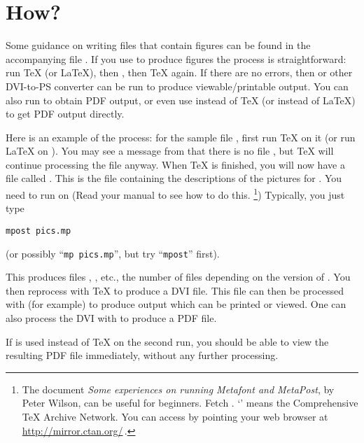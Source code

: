\documentclass[letterpaper]{article}
\begin{document}
\section{How?}\label{process}

Some guidance on writing files that contain \mfp{} figures can be found
in the accompanying file . If you use \mfp{} to
produce \MP{} figures the process is straightforward: run \TeX{} (or
\LaTeX), then \MP{}, then \TeX{} again. If there are no errors, then
 or other DVI-to-PS converter can be run to produce
viewable\slash printable output. You can also run  to obtain PDF
output, or even use \pdfTeX{} instead of \TeX{} (or \pdfLaTeX{} instead
of \LaTeX{}) to get PDF output directly.

Here is an example of the process: for the sample file
, first run \TeX{} on it (or run \LaTeX{} on
). You may see a message from \mfp{} that there is
no file , but \TeX{} will continue processing the file
anyway. When \TeX{} is finished, you will now have a file called
. This is the \MP{} file containing the descriptions of
the pictures for . You need to run \MP{} on
 (Read your \MF{} manual to see how to do
this.%
    \footnote{The document \textit{Some experiences on running Metafont
    and MetaPost}, by Peter Wilson, can be useful for beginners. Fetch
    . `' means the Comprehensive
    \TeX{} Archive Network. You can access  by pointing your
    web browser at \url{http://mirror.ctan.org/}\,.}) %
Typically, you just type
\begin{verbatim}
mpost pics.mp
\end{verbatim}
(or possibly ``\verb$mp pics.mp$'', but try ``\verb$mpost$'' first).

This produces files , , etc., the number of
files depending on the version of . You then
reprocess  with \TeX{} to produce a DVI file. This
file can then be processed with  (for example) to produce
\PS{} output which can be printed or viewed. One can also process the
DVI with  to produce a PDF file.

If \pdfTeX{} is used instead of \TeX{} on the second run, you should be
able to view the resulting PDF file immediately, without any further
processing.
\end{document}
